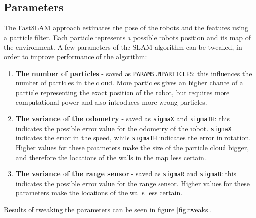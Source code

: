 \documentclass[12pt]{article}
\begin{document}
\subsection{Parameters}
The FastSLAM approach estimates the pose of the robots and the features using a particle filter. Each particle represents a possible robots position and its map of the environment. A few parameters of the SLAM algorithm can be tweaked, in order to improve performance of the algorithm:
\begin{enumerate}
\item \textbf{The number of particles} - saved as \verb|PARAMS.NPARTICLES|: this influences the number of particles in the cloud. More particles gives an higher chance of a particle representing the exact position of the robot, but requires more computational power and also introduces more wrong particles.
\item \textbf{The variance of the odometry} - saved as \verb|sigmaX| and \verb|sigmaTH|: this indicates the possible error value for the odometry of the robot. \verb|sigmaX| indicates the error in the speed, while \verb|sigmaTH| indicates the error in rotation. Higher values for these parameters make the size of the particle cloud bigger, and therefore the locations of the walls in the map less certain.
\item \textbf{The variance of the range sensor} - saved as \verb|sigmaR| and \verb|sigmaB|: this indicates the possible error value for the range sensor. Higher values for these parameters make the locations of the walls less certain.
\end{enumerate}
Results of tweaking the parameters can be seen in figure \ref{fig:tweaks}.
\end{document}
